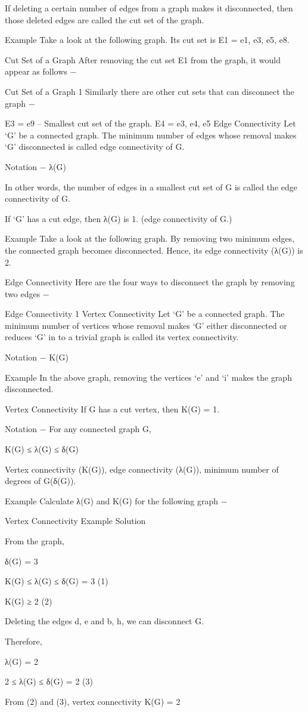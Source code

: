 If deleting a certain number of edges from a graph makes it disconnected, then those deleted edges are called the cut set of the graph.

Example
Take a look at the following graph. Its cut set is E1 = {e1, e3, e5, e8}.

Cut Set of a Graph
After removing the cut set E1 from the graph, it would appear as follows −

Cut Set of a Graph 1
Similarly there are other cut sets that can disconnect the graph −

E3 = {e9} – Smallest cut set of the graph.
E4 = {e3, e4, e5}
Edge Connectivity
Let ‘G’ be a connected graph. The minimum number of edges whose removal makes ‘G’ disconnected is called edge connectivity of G.

Notation − λ(G)

In other words, the number of edges in a smallest cut set of G is called the edge connectivity of G.

If ‘G’ has a cut edge, then λ(G) is 1. (edge connectivity of G.)

Example
Take a look at the following graph. By removing two minimum edges, the connected graph becomes disconnected. Hence, its edge connectivity (λ(G)) is 2.

Edge Connectivity
Here are the four ways to disconnect the graph by removing two edges −

Edge Connectivity 1
Vertex Connectivity
Let ‘G’ be a connected graph. The minimum number of vertices whose removal makes ‘G’ either disconnected or reduces ‘G’ in to a trivial graph is called its vertex connectivity.

Notation − K(G)

Example
In the above graph, removing the vertices ‘e’ and ‘i’ makes the graph disconnected.

Vertex Connectivity
If G has a cut vertex, then K(G) = 1.

Notation − For any connected graph G,

K(G) ≤ λ(G) ≤ δ(G)

Vertex connectivity (K(G)), edge connectivity (λ(G)), minimum number of degrees of G(δ(G)).

Example
Calculate λ(G) and K(G) for the following graph −

Vertex Connectivity Example
Solution

From the graph,

δ(G) = 3

K(G) ≤ λ(G) ≤ δ(G) = 3 (1)

K(G) ≥ 2 (2)

Deleting the edges {d, e} and {b, h}, we can disconnect G.

Therefore,

λ(G) = 2

2 ≤ λ(G) ≤ δ(G) = 2 (3)

From (2) and (3), vertex connectivity K(G) = 2


